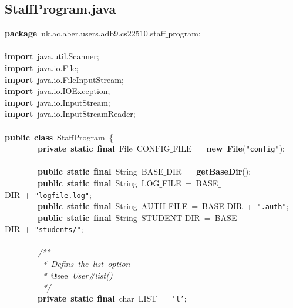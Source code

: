 \subsection{StaffProgram.java}
\scriptsize
\sffamily
\noindent
\mbox{}\textbf{package}\ uk.ac.aber.users.adb9.cs22510.staff$\_$program; \\
\mbox{} \\
\mbox{}\textbf{import}\ java.util.Scanner; \\
\mbox{}\textbf{import}\ java.io.File; \\
\mbox{}\textbf{import}\ java.io.FileInputStream; \\
\mbox{}\textbf{import}\ java.io.IOException; \\
\mbox{}\textbf{import}\ java.io.InputStream; \\
\mbox{}\textbf{import}\ java.io.InputStreamReader; \\
\mbox{} \\
\mbox{}\textbf{public}\ \textbf{class}\ StaffProgram\ \{ \\
\mbox{}\ \ \ \ \ \ \ \ \textbf{private}\ \textbf{static}\ \textbf{final}\ File\ CONFIG$\_$FILE\ =\ \textbf{new}\ \textbf{File}(\texttt{"{}config"{}}); \\
\mbox{} \\
\mbox{}\ \ \ \ \ \ \ \ \textbf{public}\ \textbf{static}\ \textbf{final}\ String\ BASE$\_$DIR\ =\ \textbf{getBaseDir}(); \\
\mbox{}\ \ \ \ \ \ \ \ \textbf{public}\ \textbf{static}\ \textbf{final}\ String\ LOG$\_$FILE\ =\ BASE$\_$DIR\ +\ \texttt{"{}logfile.log"{}}; \\
\mbox{}\ \ \ \ \ \ \ \ \textbf{public}\ \textbf{static}\ \textbf{final}\ String\ AUTH$\_$FILE\ =\ BASE$\_$DIR\ +\ \texttt{"{}.auth"{}}; \\
\mbox{}\ \ \ \ \ \ \ \ \textbf{public}\ \textbf{static}\ \textbf{final}\ String\ STUDENT$\_$DIR\ =\ BASE$\_$DIR\ +\ \texttt{"{}students/"{}}; \\
\mbox{} \\
\mbox{}\ \ \ \ \ \ \ \ \textit{/**} \\
\mbox{}\textit{\ \ \ \ \ \ \ \ \ *\ Defins\ the\ list\ option} \\
\mbox{}\textit{\ \ \ \ \ \ \ \ \ *\ }@see\textit{\ User\#list()} \\
\mbox{}\textit{\ \ \ \ \ \ \ \ \ */} \\
\mbox{}\ \ \ \ \ \ \ \ \textbf{private}\ \textbf{static}\ \textbf{final}\ char\ LIST\ =\ \texttt{'l'}; \\

